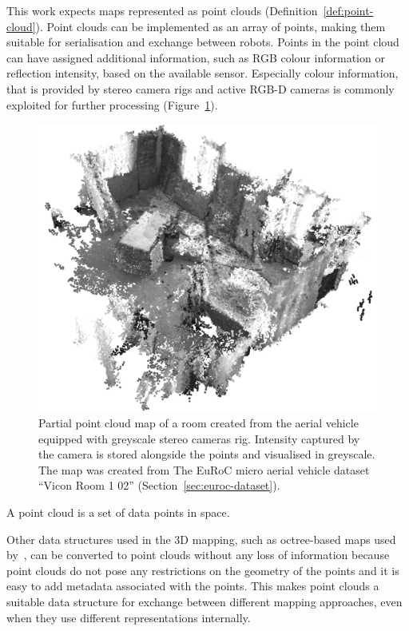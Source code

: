 This work expects maps represented as point clouds (Definition~\ref{def:point-cloud}). Point clouds can be implemented as an array of points, making them suitable for serialisation and exchange between robots. Points in the point cloud can have assigned additional information, such as \gls{RGB} colour information or reflection intensity, based on the available sensor. Especially colour information, that is provided by stereo camera rigs and active \gls{RGB-D} cameras is commonly exploited for further processing (Figure~\ref{fig:v1-greyscale}).

\begin{figure}
    \centering
    \includegraphics[width=\textwidth]{../img/v1-greyscale.png}
    \caption[A point cloud map with greyscale colours]{Partial point cloud map of a room created from the aerial vehicle equipped with greyscale stereo cameras rig. Intensity captured by the camera is stored alongside the points and visualised in greyscale. The map was created from The EuRoC micro aerial vehicle dataset ``Vicon Room 1 02'' (Section~\ref{sec:euroc-dataset}).}
    \label{fig:v1-greyscale}
\end{figure}

\begin{defn}
\label{def:point-cloud}
A point cloud is a set of data points in space.
\end{defn}

Other data structures used in the \gls{3D} mapping, such as octree-based maps used by~\citet{hornung2013octomap}, can be converted to point clouds without any loss of information because point clouds do not pose any restrictions on the geometry of the points and it is easy to add metadata associated with the points. This makes point clouds a suitable data structure for exchange between different mapping approaches, even when they use different representations internally.

